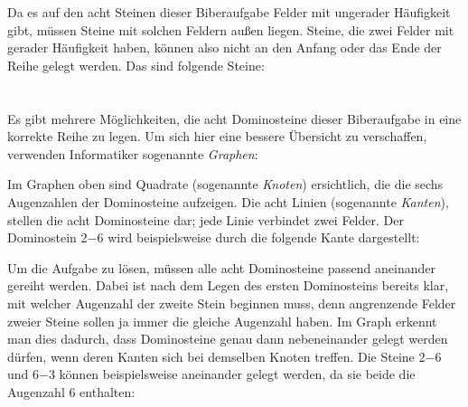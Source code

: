 {{{\centering%
\par}

Da es auf den acht Steinen dieser Biberaufgabe Felder mit ungerader Häufigkeit gibt, müssen Steine mit solchen Feldern außen liegen.  Steine, die zwei Felder mit gerader Häufigkeit haben, können also nicht an den Anfang oder das Ende der Reihe gelegt werden. Das sind folgende Steine:

{\centering%
\par}



\section*{\BrochureItsInformatics}
Es gibt mehrere Möglichkeiten, die acht Dominosteine dieser Biberaufgabe in eine korrekte Reihe zu legen. Um sich hier eine bessere Übersicht zu verschaffen, verwenden Informatiker sogenannte \emph{Graphen}:

{\centering%
\par}

Im Graphen oben sind Quadrate (sogenannte \emph{Knoten}) ersichtlich, die die sechs Augenzahlen der Dominosteine aufzeigen. Die acht Linien (sogenannte \emph{Kanten}), stellen die acht Dominosteine dar; jede Linie verbindet zwei Felder. Der Dominostein 2$-6$ wird beispielsweise durch die folgende Kante dargestellt:

{\centering%
\par}

Um die Aufgabe zu lösen, müssen alle acht Dominosteine passend aneinander gereiht werden. Dabei ist nach dem Legen des ersten Dominosteins bereits klar, mit welcher Augenzahl der zweite Stein beginnen muss, denn angrenzende Felder zweier Steine sollen ja immer die gleiche Augenzahl haben. Im Graph erkennt man dies dadurch, dass Dominosteine genau dann nebeneinander gelegt werden dürfen, wenn deren Kanten sich bei demselben Knoten treffen. Die Steine 2$-6$ und 6$-3$ können beispielsweise aneinander gelegt werden, da sie beide die Augenzahl $6$ enthalten:

{\centering%
\par}

}}
